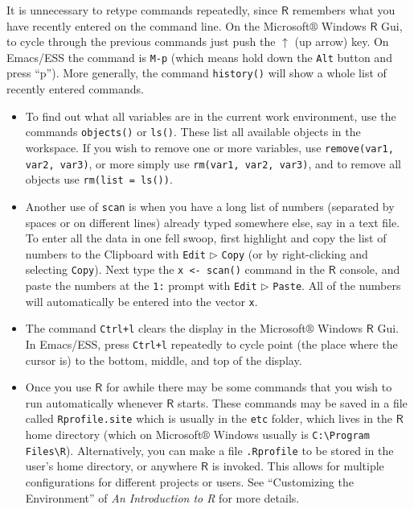 \documentclass[captions=tableheading]{scrbook}
\begin{document}
It is unnecessary to retype commands repeatedly, since \(\mathsf{R}\) remembers what you have recently entered on the command line. On the Microsoft\(\circledR\) Windows \(\mathsf{R}\) Gui, to cycle through the previous commands just push the \(\uparrow\) (up arrow) key. On Emacs/ESS the command is \texttt{M-p} (which means hold down the \texttt{Alt} button and press ``p''). More generally, the command \texttt{history()} will show a whole list of recently entered commands. 
\begin{itemize}
\item To find out what all variables are in the current work environment, use the commands \texttt{objects()} or \texttt{ls()}. These list all available objects in the workspace. If you wish to remove one or more variables, use \texttt{remove(var1, var2, var3)}, or more simply use \texttt{rm(var1, var2, var3)}, and to remove all objects use \texttt{rm(list = ls())}.
\item Another use of \texttt{scan} is when you have a long list of numbers (separated by spaces or on different lines) already typed somewhere else, say in a text file. To enter all the data in one fell swoop, first highlight and copy the list of numbers to the Clipboard with \texttt{Edit} \(\triangleright\) \texttt{Copy} (or by right-clicking and selecting \texttt{Copy}). Next type the \texttt{x <- scan()} command in the \(\mathsf{R}\) console, and paste the numbers at the \texttt{1:} prompt with \texttt{Edit} \(\triangleright\) \texttt{Paste}. All of the numbers will automatically be entered into the vector \texttt{x}.
\item The command \texttt{Ctrl+l} clears the display in the Microsoft\(\circledR\) Windows \(\mathsf{R}\) Gui. In Emacs/ESS, press \texttt{Ctrl+l} repeatedly to cycle point (the place where the cursor is) to the bottom, middle, and top of the display.
\item Once you use \(\mathsf{R}\) for awhile there may be some commands that you wish to run automatically whenever \(\mathsf{R}\) starts. These commands may be saved in a file called \texttt{Rprofile.site} which is usually in the \texttt{etc} folder, which lives in the \(\mathsf{R}\) home directory (which on Microsoft\(\circledR\) Windows usually is \texttt{C:\textbackslash{}Program Files\textbackslash{}R}). Alternatively, you can make a file \texttt{.Rprofile} to be stored in the user's home directory, or anywhere \(\mathsf{R}\) is invoked. This allows for multiple configurations for different projects or users. See ``Customizing the Environment'' of \emph{An Introduction to R} for more details.

\end{itemize}
\end{document}
